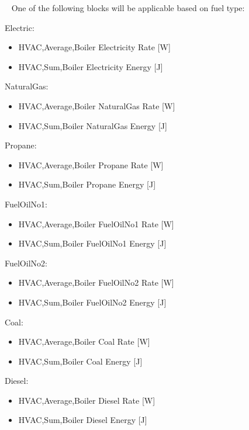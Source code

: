 ~ One of the following blocks will be applicable based on fuel type:

Electric:

\begin{itemize}
    \item
    HVAC,Average,Boiler Electricity Rate {[}W{]}
    \item
    HVAC,Sum,Boiler Electricity Energy {[}J{]}
\end{itemize}

NaturalGas:

\begin{itemize}
    \item
    HVAC,Average,Boiler NaturalGas Rate {[}W{]}
    \item
    HVAC,Sum,Boiler NaturalGas Energy {[}J{]}
\end{itemize}

Propane:

\begin{itemize}
    \item
    HVAC,Average,Boiler Propane Rate {[}W{]}
    \item
    HVAC,Sum,Boiler Propane Energy {[}J{]}
\end{itemize}

FuelOilNo1:

\begin{itemize}
    \item
    HVAC,Average,Boiler FuelOilNo1 Rate {[}W{]}
    \item
    HVAC,Sum,Boiler FuelOilNo1 Energy {[}J{]}
\end{itemize}

FuelOilNo2:

\begin{itemize}
    \item
    HVAC,Average,Boiler FuelOilNo2 Rate {[}W{]}
    \item
    HVAC,Sum,Boiler FuelOilNo2 Energy {[}J{]}
\end{itemize}

Coal:

\begin{itemize}
    \item
    HVAC,Average,Boiler Coal Rate {[}W{]}
    \item
    HVAC,Sum,Boiler Coal Energy {[}J{]}
\end{itemize}

Diesel:

\begin{itemize}
    \item
    HVAC,Average,Boiler Diesel Rate {[}W{]}
    \item
    HVAC,Sum,Boiler Diesel Energy {[}J{]}
\end{itemize}

